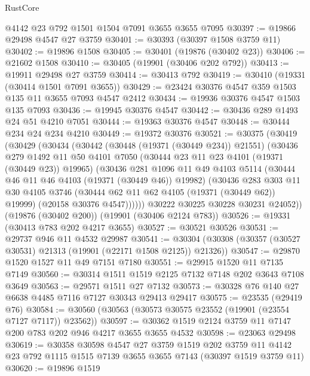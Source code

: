 \begin{lexlean}{RustCore}
\begin{coremodule}
    @4142
    @23
    @792
    @1501
    @1504
    @7091
    @3655
    @3655
    @7095
@30397 := @19866 @29498 @4547 @27 @3759
@30401 := @30393 (@30397 @1508 @3759 @11)
@30402 := @19896 @1508
@30405 := @30401 (@19876 (@30402 @23))
@30406 := @21602 @1508
@30410 := @30405 (@19901 (@30406 @202 @792))
@30413 := @19911 @29498 @27 @3759
@30414 := @30413 @792
@30419 := @30410 (@19331 (@30414 @1501 @7091 @3655))
@30429 := @23424 @30376 @4547 @359 @1503 @135 @11 @3655 @7093 @4547 @2412
@30434 := @19936 @30376 @4547 @1503 @135 @7093
@30436 := @19945 @30376 @4547
@30442 := @30436 @289 @1493 @24 @51 @4210 @7051
@30444 := @19363 @30376 @4547
@30448 := @30444 @234 @24 @234 @4210
@30449 := @19372 @30376
@30521 := @30375
    (@30419
      (@30429
        (@30434
          (@30442
            (@30448 (@19371 (@30449 @234)) @21551)
            (@30436
              @279
              @1492
              @11
              @50
              @4101
              @7050
              (@30444 @23 @11 @23 @4101 (@19371 (@30449 @23)) @19965)
              (@30436
                @281
                @1096
                @11
                @49
                @4103
                @5114
                (@30444 @46 @11 @46 @4103 (@19371 (@30449 @46)) @19982)
                (@30436
                  @283
                  @303
                  @11
                  @30
                  @4105
                  @3746
                  (@30444 @62 @11 @62 @4105 (@19371 (@30449 @62)) @19999)
                  (@20158 @30376 @4547))))))
        @30222
        @30225
        @30228
        @30231
        @24052))
    (@19876 (@30402 @200))
    (@19901 (@30406 @2124 @783))
@30526 := @19331 (@30413 @783 @202 @4217 @3655)
@30527 := @30521 @30526
@30531 := @29737 @946 @11 @4532 @29987
@30541 := @30304 (@30308 (@30357 (@30527 @30531) @21313 (@19901 (@22171 @1508 @2125)) @21326))
@30547 := @29870 @1520 @1527 @11 @49 @7151 @7180
@30551 := @29915 @1520 @11 @7135 @7149
@30560 := @30314 @1511 @1519 @2125 @7132 @7148 @202 @3643 @7108 @3649
@30563 := @29571 @1511 @27 @7132
@30573 := @30328 @76 @140 @27 @6638 @4485 @7116 @7127 @30343 @29413 @29417
@30575 := @23535 (@29419 @76)
@30584 := @30560 (@30563 (@30573 @30575 @23552 (@19901 (@23554 @7127 @7117)) @23562))
@30597 := @30362 @1519 @2124 @3759 @11 @7147 @200 @783 @202 @946 @4217 @3655 @3655 @4532
@30598 := @23063 @29498
@30619 := @30358
    @30598
    @4547
    @27
    @3759
    @1519
    @202
    @3759
    @11
    @4142
    @23
    @792
    @1115
    @1515
    @7139
    @3655
    @3655
    @7143
    (@30397 @1519 @3759 @11)
@30620 := @19896 @1519

\end{coremodule}
\end{lexlean}
